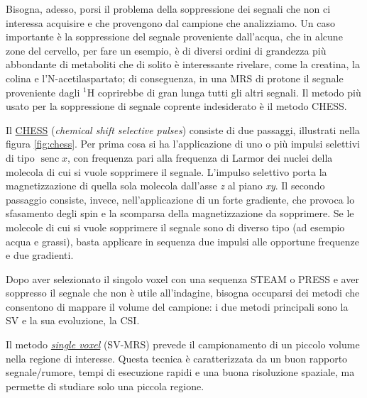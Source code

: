\documentclass{report}
\newcommand{\figref}[1]{figura \ref{#1}}
\numberwithin{equation}{section}
\numberwithin{figure}{section}
\DeclareMathOperator{\senc}{senc}
\begin{document}
Bisogna, adesso, porsi il problema della soppressione dei segnali che non ci interessa acquisire e che provengono dal campione che analizziamo. Un caso importante è la soppressione del segnale proveniente dall'acqua, che in alcune zone del cervello, per fare un esempio, è di diversi ordini di grandezza più abbondante di metaboliti che di solito è interessante rivelare, come la creatina, la colina e l'N-acetilaspartato; di conseguenza, in una MRS di protone il segnale proveniente dagli $\mathrm{^1H}$ coprirebbe di gran lunga tutti gli altri segnali. Il metodo più usato per la soppressione di segnale coprente indesiderato è il metodo CHESS.

Il \underline{CHESS} (\textit{chemical shift selective pulses}) consiste di due passaggi, illustrati nella \figref{fig:chess}. Per prima cosa si ha l'applicazione di uno o più impulsi selettivi di tipo $\senc{x}$, con frequenza pari alla frequenza di Larmor dei nuclei della molecola di cui si vuole sopprimere il segnale. L'impulso selettivo porta la magnetizzazione di quella sola molecola dall'asse \textit{z} al piano \textit{xy}. Il secondo passaggio consiste, invece, nell'applicazione di un forte gradiente, che provoca lo sfasamento degli spin e la scomparsa della magnetizzazione da sopprimere. Se le molecole di cui si vuole sopprimere il segnale sono di diverso tipo (ad esempio acqua e grassi), basta applicare in sequenza due impulsi alle opportune frequenze e due gradienti. 

Dopo aver selezionato il singolo voxel con una sequenza STEAM o PRESS e aver soppresso il segnale che non è utile all'indagine, bisogna occuparsi dei metodi che consentono di mappare il volume del campione: i due metodi principali sono la SV e la sua evoluzione, la CSI.

Il metodo \underline{\textit{single voxel}} (SV-MRS) prevede il campionamento di un piccolo volume nella regione di interesse. Questa tecnica è caratterizzata da un buon rapporto segnale/rumore, tempi di esecuzione rapidi e una buona risoluzione spaziale, ma permette di studiare solo una piccola regione.
\end{document}
